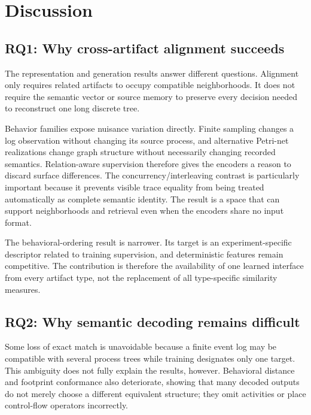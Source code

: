 \documentclass[pdflatex,sn-basic]{sn-jnl}
\newcommand{\RQone}{\textbf{RQ1}}
\newcommand{\RQtwo}{\textbf{RQ2}}
\begin{document}
\FloatBarrier
\section{Discussion}\label{sec:discussion}

\subsection{\RQone: Why cross-artifact alignment succeeds}

The representation and generation results answer different questions. Alignment only requires related artifacts to occupy compatible neighborhoods. It does not require the semantic vector or source memory to preserve every decision needed to reconstruct one long discrete tree.

Behavior families expose nuisance variation directly. Finite sampling changes a log observation without changing its source process, and alternative Petri-net realizations change graph structure without necessarily changing recorded semantics. Relation-aware supervision therefore gives the encoders a reason to discard surface differences. The concurrency/interleaving contrast is particularly important because it prevents visible trace equality from being treated automatically as complete semantic identity. The result is a space that can support neighborhoods and retrieval even when the encoders share no input format.

The behavioral-ordering result is narrower. Its target is an experiment-specific descriptor related to training supervision, and deterministic features remain competitive. The contribution is therefore the availability of one learned interface from every artifact type, not the replacement of all type-specific similarity measures.

\subsection{\RQtwo: Why semantic decoding remains difficult}

Some loss of exact match is unavoidable because a finite event log may be compatible with several process trees while training designates only one target. This ambiguity does not fully explain the results, however. Behavioral distance and footprint conformance also deteriorate, showing that many decoded outputs do not merely choose a different equivalent structure; they omit activities or place control-flow operators incorrectly.
\end{document}
